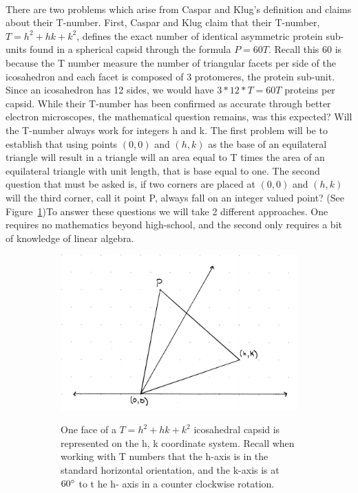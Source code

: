 \documentclass[12pt,letter]{article}
\begin{document}
\paragraph{}
There are two problems which arise from Caspar and Klug's definition and claims about their T-number. First, Caspar and Klug claim that their T-number, $T = h^2 + hk + k^2$, defines the exact number of identical asymmetric protein sub-units found in a spherical capsid through the formula $P = 60T$. Recall this 60 is because the T number measure the number of triangular facets per side of the icosahedron and each facet is composed of 3 protomeres, the protein sub-unit. Since an icosahedron has 12 sides, we would have $3*12*T = 60T$ proteins per capsid. While their T-number has been confirmed as accurate through better electron microscopes, the mathematical question remains, was this expected? Will the T-number always work for integers h and k. The first problem will be to establish that using points $(0,0)$ and $(h,k)$ as the base of an equilateral triangle will result in a triangle will an area equal to T times the area of an equilateral triangle with unit length, that is base equal to one. The second question that must be asked is, if two corners are placed at $(0,0)$ and $(h,k)$ will the third corner, call it point P, always fall on an integer valued point? (See Figure~\ref{fig:setup})To answer these questions we will take 2 different approaches. One requires no mathematics beyond high-school, and the second only requires a bit of knowledge of linear algebra.

\begin{figure}[h]
	\caption{Equilateral Triangle on h, k-axes}
	\centering
	\begin{subfigure}[h]{.75\textwidth}
	\begin{center}
	\includegraphics[width=.8\textwidth]{ddagger0_tri_setup.pdf}
	\end{center}
		One face of a $T=h^2 + hk + k^2$ icosahedral capsid is represented on the h, k coordinate system. Recall when 		working with T numbers that the h-axis is in the standard horizontal orientation, and the k-axis is at $60 \degree$ to t		he h-	axis in a counter clockwise rotation.
	\end{subfigure}
	\label{fig:setup}
\end{figure}
\end{document}
